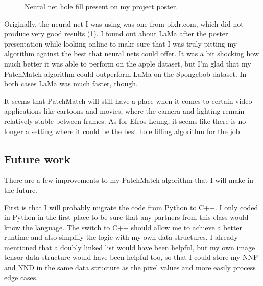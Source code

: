 \begin{figure}
\centering
{}
\caption{Neural net hole fill present on my project poster.}
\label{fig:pixlr}
\end{figure}

Originally, the neural net I was using was one from pixlr.com, which did not produce very good results (\ref{fig:pixlr}). I found out about LaMa after the poster presentation while looking online to make sure that I was truly pitting my algorithm against the best that neural nets could offer. It was a bit shocking how much better it was able to perform on the apple dataset, but I'm glad that my PatchMatch algorithm could outperform LaMa on the Spongebob dataset. In both cases LaMa was much faster, though.

It seems that PatchMatch will still have a place when it comes to certain video applications like cartoons and movies, where the camera and lighting remain relatively stable between frames. As for Efros Leung, it seems like there is no longer a setting where it could be the best hole filling algorithm for the job.

\subsection*{Future work}
There are a few improvements to my PatchMatch algorithm that I will make in the future.

First is that I will probably migrate the code from Python to C++. I only coded in Python in the first place to be sure that any partners from this class would know the language. The switch to C++ should allow me to achieve a better runtime and also simplify the logic with my own data structures. I already mentioned that a doubly linked list would have been helpful, but my own image tensor data structure would have been helpful too, so that I could store my NNF and NND in the same data structure as the pixel values and more easily process edge cases.

